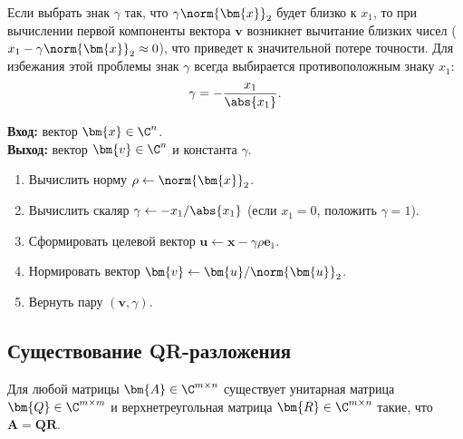 \begin{tcbwarning}
    Если выбрать знак $\gamma$ так, что $\gamma \norm{\bm{x}}_2$ будет близко к $x_1$, то при вычислении первой компоненты вектора $\bm{v}$ возникнет вычитание близких чисел ($x_1 - \gamma \norm{\bm{x}}_2 \approx 0$), что приведет к значительной потере точности. Для избежания этой проблемы знак $\gamma$ всегда выбирается противоположным знаку $x_1$:
    \begin{equation}
        \gamma = -\frac{x_1}{\abs{x_1}}.
        \label{eq:gamma_choice}
    \end{equation}
\end{tcbwarning}

\begin{tcbalgorithmbox}
\label{alg:householder_vec}
    \textbf{Вход:} вектор $\bm{x} \in \C^n$.\\
    \textbf{Выход:} вектор $\bm{v} \in \C^n$ и константа $\gamma$.
    \begin{enumerate}
        \item Вычислить норму $\rho \gets \norm{\bm{x}}_2$.
        \item Вычислить скаляр $\gamma \gets -x_1 / \abs{x_1}$ (если $x_1 = 0$, положить $\gamma = 1$).
        \item Сформировать целевой вектор $\bm{u} \gets \bm{x} - \gamma \rho \bm{e}_1$.
        \item Нормировать вектор $\bm{v} \gets \bm{u} / \norm{\bm{u}}_2$.
        \item Вернуть пару $(\bm{v}, \gamma)$.
    \end{enumerate}
\end{tcbalgorithmbox}

\subsection{Существование QR-разложения}
\label{sec:qr_existence}

\begin{tcbtheorem}
\label{thm:qr_exist}
    Для любой матрицы $\bm{A} \in \C^{m \times n}$ существует унитарная матрица $\bm{Q} \in \C^{m \times m}$ и верхнетреугольная матрица $\bm{R} \in \C^{m \times n}$ такие, что $\bm{A} = \bm{Q}\bm{R}$.
\end{tcbtheorem}

